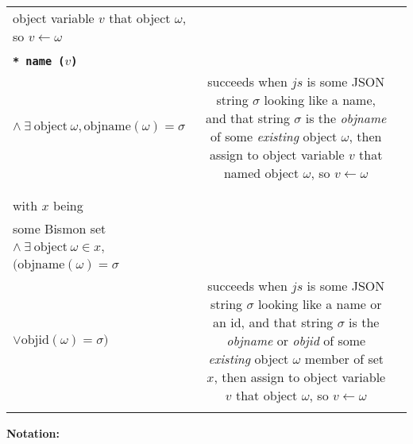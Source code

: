 \begin{table}
\begin{relsize}{-1.2}
\begin{center}
\begin{tabular}{lcp{5.7cm}}
      object variable $v$ that object $\omega$, so  $v \leftarrow \omega$ \\
            \rule{0pt}{1ex} \\
      \texttt{\textbf{* name ($v$)}} &
      \begin{minipage}[t]{4.5cm}
        $\mathit{js} \equiv \mathrm{some ~ JSON ~ string}~ \sigma$\\
        \hspace*{0.5em} $ \wedge ~ \exists ~ \mathrm{object} ~ \omega, \mathrm{objname}(\omega) = \sigma$ 
      \end{minipage}
      &
      succeeds when $\mathit{js}$ is some JSON string $\sigma$ looking like a name, and that string $\sigma$ is the \emph{objname} of some \emph{existing} object $\omega$, then assign to
      object variable $v$ that named object $\omega$, so  $v \leftarrow \omega$ \\
      \rule{0pt}{3ex} \\
      \begin{minipage}[t]{3cm}
        \texttt{\textbf{* set ($x ~ v$)}} \\
        with $x$ being \\
        some Bismon set
      \end{minipage}
        &
      \begin{minipage}[t]{4.5cm}
        $\mathit{js} \equiv \mathrm{some ~ JSON ~ string}~ \sigma$\\
        \hspace*{0.5em} $ \wedge ~ \exists ~ \mathrm{object} ~ \omega \in x, $  \\
        \hspace*{1.8em} $ ( \mathrm{objname}(\omega) = \sigma $ \\
        \hspace*{2em} $  \vee  \mathrm{objid}(\omega) = \sigma )$ 
      \end{minipage}
      &
      succeeds when $\mathit{js}$ is some JSON string $\sigma$ looking like a name or an id, and that string $\sigma$ is the \emph{objname} or \emph{objid} of some \emph{existing} object $\omega$ member of  set $x$, then assign to
      object variable $v$ that object $\omega$, so  $v \leftarrow \omega$ \\
      \rule{0pt}{3ex} \\
    \end{tabular}
  \end{center}
  \bigskip
  \textbf{Notation:} \hspace{0.6em} \begin{minipage}{0.9\textwidth}

\end{minipage}
\end{relsize}
\end{table}
